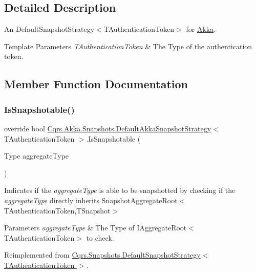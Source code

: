 \subsection{Detailed Description}
An Default\+Snapshot\+Strategy$<$\+T\+Authentication\+Token$>$ for \hyperlink{namespaceCqrs_1_1Akka}{Akka}. 


\begin{DoxyTemplParams}{Template Parameters}
{\em T\+Authentication\+Token} & The Type of the authentication token.\\
\hline
\end{DoxyTemplParams}


\subsection{Member Function Documentation}
\mbox{\label{classCqrs_1_1Akka_1_1Snapshots_1_1DefaultAkkaSnapshotStrategy_ad7d9bb43fc53cf16a242510612f4c13e_ad7d9bb43fc53cf16a242510612f4c13e}} 
\subsubsection{\texorpdfstring{Is\+Snapshotable()}{IsSnapshotable()}}
{\footnotesize\ttfamily override bool \hyperlink{classCqrs_1_1Akka_1_1Snapshots_1_1DefaultAkkaSnapshotStrategy}{Cqrs.\+Akka.\+Snapshots.\+Default\+Akka\+Snapshot\+Strategy}$<$ T\+Authentication\+Token $>$.Is\+Snapshotable (\begin{DoxyParamCaption}\item[{Type}]{aggregate\+Type }\end{DoxyParamCaption})\hspace{0.3cm}{\ttfamily [virtual]}}



Indicates if the {\itshape aggregate\+Type}  is able to be snapshotted by checking if the {\itshape aggregate\+Type}  directly inherits Snapshot\+Aggregate\+Root$<$\+T\+Authentication\+Token,\+T\+Snapshot$>$ 


\begin{DoxyParams}{Parameters}
{\em aggregate\+Type} & The Type of I\+Aggregate\+Root$<$\+T\+Authentication\+Token$>$ to check.\\
\hline
\end{DoxyParams}


Reimplemented from \hyperlink{classCqrs_1_1Snapshots_1_1DefaultSnapshotStrategy_acdbb918ac01b526aedb5fa9a3879887a_acdbb918ac01b526aedb5fa9a3879887a}{Cqrs.\+Snapshots.\+Default\+Snapshot\+Strategy$<$ T\+Authentication\+Token $>$}.


